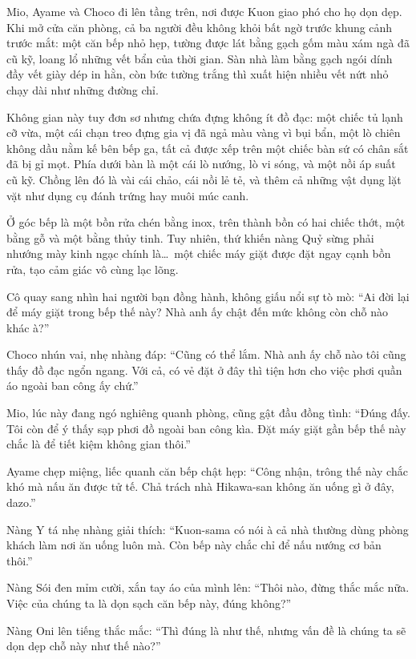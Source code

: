 \documentclass[../main.tex]{subfiles}
\begin{document}
Mio, Ayame và Choco đi lên tầng trên, nơi được Kuon giao phó cho họ dọn dẹp. Khi mở cửa căn phòng, cả ba người đều không khỏi bất ngờ trước khung cảnh trước mắt: một căn bếp nhỏ hẹp, tường được lát bằng gạch gốm màu xám ngà đã cũ kỹ, loang lổ những vết bẩn của thời gian. Sàn nhà làm bằng gạch ngói dính đầy vết giày dép in hằn, còn bức tường trắng thì xuất hiện nhiều vết nứt nhỏ chạy dài như những đường chỉ.

Không gian này tuy đơn sơ nhưng chứa đựng không ít đồ đạc: một chiếc tủ lạnh cỡ vừa, một cái chạn treo đựng gia vị đã ngả màu vàng vì bụi bẩn, một lò chiên không dầu nằm kế bên bếp ga, tất cả được xếp trên một chiếc bàn sứ có chân sắt đã bị gỉ mọt. Phía dưới bàn là một cái lò nướng, lò vi sóng, và một nồi áp suất cũ kỹ. Chồng lên đó là vài cái chảo, cái nồi lẻ tẻ, và thêm cả những vật dụng lặt vặt như dụng cụ đánh trứng hay muôi múc canh.

Ở góc bếp là một bồn rửa chén bằng inox, trên thành bồn có hai chiếc thớt, một bằng gỗ và một bằng thủy tinh. Tuy nhiên, thứ khiến nàng Quỷ sừng phải nhướng mày kinh ngạc chính là\dots\ một chiếc máy giặt được đặt ngay cạnh bồn rửa, tạo cảm giác vô cùng lạc lõng.

Cô quay sang nhìn hai người bạn đồng hành, không giấu nổi sự tò mò: ``Ai đời lại để máy giặt trong bếp thế này? Nhà anh ấy chật đến mức không còn chỗ nào khác à?''

Choco nhún vai, nhẹ nhàng đáp: ``Cũng có thể lắm. Nhà anh ấy chỗ nào tôi cũng thấy đồ đạc ngổn ngang. Với cả, có vẻ đặt ở đây thì tiện hơn cho việc phơi quần áo ngoài ban công ấy chứ.''

Mio, lúc này đang ngó nghiêng quanh phòng, cũng gật đầu đồng tình: ``Đúng đấy. Tôi còn để ý thấy sạp phơi đồ ngoài ban công kìa. Đặt máy giặt gần bếp thế này chắc là để tiết kiệm không gian thôi.''

Ayame chẹp miệng, liếc quanh căn bếp chật hẹp: ``Công nhận, trông thế này chắc khó mà nấu ăn được tử tế. Chả trách nhà Hikawa-san không ăn uống gì ở đây, dazo.''

Nàng Y tá nhẹ nhàng giải thích: ``Kuon-sama có nói à cả nhà thường dùng phòng khách làm nơi ăn uống luôn mà. Còn bếp này chắc chỉ để nấu nướng cơ bản thôi.''

Nàng Sói đen mỉm cười, xắn tay áo của mình lên: ``Thôi nào, đừng thắc mắc nữa. Việc của chúng ta là dọn sạch căn bếp này, đúng không?''

Nàng Oni lên tiếng thắc mắc: ``Thì đúng là như thế, nhưng vấn đề là chúng ta sẽ dọn dẹp chỗ này như thế nào?''
\end{document}
